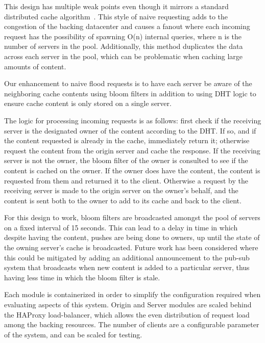 \documentclass[conference]{IEEEtran}
\begin{document}
This design has multiple weak points even though it mirrors a standard distributed cache algorithm~\cite{mao2012cache}.  This style of naive requesting adds to the congestion of the backing datacenter and causes a fanout where each incoming request has the possibility of spawning O(n) internal queries, where n is the number of servers in the pool.  Additionally, this method duplicates the data across each server in the pool, which can be problematic when caching large amounts of content.

Our enhancement to naive flood requests is to have each server be aware of the neighboring cache contents using bloom filters in addition to using DHT logic to ensure cache content is only stored on a single server.  

The logic for processing incoming requests is as follows: first check if the receiving server is the designated owner of the content according to the DHT.  If so, and if the content requested is already in the cache, immediately return it; otherwise request the content from the origin server and cache the response.  If the receiving server is not the owner, the bloom filter of the owner is consulted to see if the content is cached on the owner.  If the owner does have the content, the content is requested  from them and returned it to the client. Otherwise a request by the receiving server is made to the origin server on the owner’s behalf, and the content is sent both to the owner to add to its cache and back to the client. 

For this design to work, bloom filters are broadcasted amongst the pool of servers on a fixed interval of 15 seconds.  This can lead to a delay in time in which despite having the content, pushes are being done to owners, up until the state of the owning server’s cache is broadcasted. Future work has been considered where this could be mitigated by adding an additional announcement to the pub-sub system that broadcasts when new content is added to a particular server, thus having less time in which the bloom filter is stale.

Each module is containerized in order to simplify the configuration required when evaluating aspects of this system.  Origin and Server modules are scaled behind the HAProxy load-balancer, which allows the even distribution of request load among the backing resources. The number of clients are a configurable parameter of the system, and can be scaled for testing. 
\end{document}
